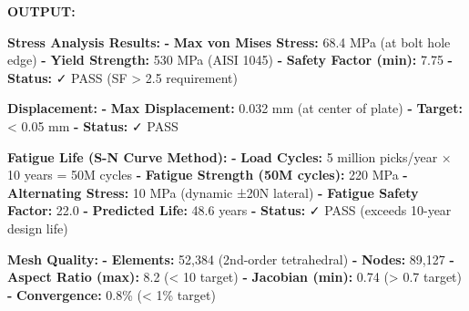 \documentclass[
]{article}
\newenvironment{Shaded}{\begin{snugshade}}{\end{snugshade}}
\newcommand{\AttributeTok}[1]{\textcolor[rgb]{0.13,0.29,0.53}{#1}}
\newcommand{\FloatTok}[1]{\textcolor[rgb]{0.00,0.00,0.81}{#1}}
\newcommand{\FunctionTok}[1]{\textcolor[rgb]{0.13,0.29,0.53}{\textbf{#1}}}
\newcommand{\KeywordTok}[1]{\textcolor[rgb]{0.13,0.29,0.53}{\textbf{#1}}}
\begin{document}
\textbf{OUTPUT:}

\begin{Shaded}
\begin{Highlighting}[]
\FunctionTok{Stress Analysis Results}\KeywordTok{:}
\AttributeTok{  }\KeywordTok{{-}}\AttributeTok{ }\FunctionTok{Max von Mises Stress}\KeywordTok{:}\AttributeTok{ 68.4 MPa (at bolt hole edge)}
\AttributeTok{  }\KeywordTok{{-}}\AttributeTok{ }\FunctionTok{Yield Strength}\KeywordTok{:}\AttributeTok{ 530 MPa (AISI 1045)}
\AttributeTok{  }\KeywordTok{{-}}\AttributeTok{ }\FunctionTok{Safety Factor (min)}\KeywordTok{:}\AttributeTok{ }\FloatTok{7.75}
\AttributeTok{  }\KeywordTok{{-}}\AttributeTok{ }\FunctionTok{Status}\KeywordTok{:}\AttributeTok{ ✓ PASS (SF \textgreater{} 2.5 requirement)}

\FunctionTok{Displacement}\KeywordTok{:}
\AttributeTok{  }\KeywordTok{{-}}\AttributeTok{ }\FunctionTok{Max Displacement}\KeywordTok{:}\AttributeTok{ 0.032 mm (at center of plate)}
\AttributeTok{  }\KeywordTok{{-}}\AttributeTok{ }\FunctionTok{Target}\KeywordTok{:}\AttributeTok{ \textless{} 0.05 mm}
\AttributeTok{  }\KeywordTok{{-}}\AttributeTok{ }\FunctionTok{Status}\KeywordTok{:}\AttributeTok{ ✓ PASS}

\FunctionTok{Fatigue Life (S{-}N Curve Method)}\KeywordTok{:}
\AttributeTok{  }\KeywordTok{{-}}\AttributeTok{ }\FunctionTok{Load Cycles}\KeywordTok{:}\AttributeTok{ 5 million picks/year × 10 years = 50M cycles}
\AttributeTok{  }\KeywordTok{{-}}\AttributeTok{ }\FunctionTok{Fatigue Strength (50M cycles)}\KeywordTok{:}\AttributeTok{ 220 MPa}
\AttributeTok{  }\KeywordTok{{-}}\AttributeTok{ }\FunctionTok{Alternating Stress}\KeywordTok{:}\AttributeTok{ 10 MPa (dynamic ±20N lateral)}
\AttributeTok{  }\KeywordTok{{-}}\AttributeTok{ }\FunctionTok{Fatigue Safety Factor}\KeywordTok{:}\AttributeTok{ }\FloatTok{22.0}
\AttributeTok{  }\KeywordTok{{-}}\AttributeTok{ }\FunctionTok{Predicted Life}\KeywordTok{:}\AttributeTok{ 48.6 years}
\AttributeTok{  }\KeywordTok{{-}}\AttributeTok{ }\FunctionTok{Status}\KeywordTok{:}\AttributeTok{ ✓ PASS (exceeds 10{-}year design life)}

\FunctionTok{Mesh Quality}\KeywordTok{:}
\AttributeTok{  }\KeywordTok{{-}}\AttributeTok{ }\FunctionTok{Elements}\KeywordTok{:}\AttributeTok{ 52,384 (2nd{-}order tetrahedral)}
\AttributeTok{  }\KeywordTok{{-}}\AttributeTok{ }\FunctionTok{Nodes}\KeywordTok{:}\AttributeTok{ 89,127}
\AttributeTok{  }\KeywordTok{{-}}\AttributeTok{ }\FunctionTok{Aspect Ratio (max)}\KeywordTok{:}\AttributeTok{ 8.2 (\textless{} 10 target)}
\AttributeTok{  }\KeywordTok{{-}}\AttributeTok{ }\FunctionTok{Jacobian (min)}\KeywordTok{:}\AttributeTok{ 0.74 (\textgreater{} 0.7 target)}
\AttributeTok{  }\KeywordTok{{-}}\AttributeTok{ }\FunctionTok{Convergence}\KeywordTok{:}\AttributeTok{ 0.8\% (\textless{} 1\% target)}
\end{Highlighting}
\end{Shaded}
\end{document}
